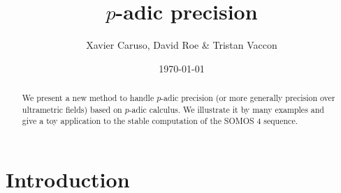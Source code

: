 \documentclass{lms}
\begin{document}
\newtheorem{theo}{Theorem}[section]
\newtheorem{lem}[theo]{Lemma}
\newtheorem{prop}[theo]{Proposition}
\newtheorem{cor}[theo]{Corollary}
\newtheorem{quest}[theo]{Question}
\newtheorem{rem}[theo]{Remark}
\newtheorem{ex}[theo]{Example}
\newtheorem{deftn}[theo]{Definition}
\newtheorem{rmk}[theo]{Remark}

\newcommand{\Z}{\mathbb Z}
\newcommand{\Zp}{\Z_p}
\newcommand{\Q}{\mathbb Q}
\newcommand{\Qp}{\Q_p}
\newcommand{\Fp}{\mathbb{F}_p}
\newcommand{\R}{\mathbb R}
\renewcommand{\O}{\mathcal O}
\newcommand{\OK}{\mathcal{O}_K}
\newcommand{\XX}{\mathbf X}
\newcommand{\trans}{{}^{\text t}}

\newcommand{\GL}{\text{\rm GL}}

\newcommand{\val}{\text{\rm val}}
\newcommand{\pr}{\text{\rm pr}}
\newcommand{\tr}{\text{\rm Tr}}
\newcommand{\com}{\text{\rm Com}}
\newcommand{\Grass}{\text{\rm Grass}}
\renewcommand{\prec}{\text{\rm prec}}

\newcommand{\lb}{\ensuremath{\llbracket}}
\newcommand{\rb}{\ensuremath{\rrbracket}}

\def\todo#1{\ \!\!{\color{red} #1}}
\def\todofor#1#2{\ \!\!{\color{purple} {\bf #1}: #2}}

\title{$p$-adic precision}
\author{Xavier Caruso, David Roe \& Tristan Vaccon}
\date\today

\maketitle
\begin{abstract}
We present a new method to handle $p$-adic precision (or more generally
precision over ultrametric fields) based on $p$-adic calculus.
We illustrate it by many examples and give a toy application to the
stable computation of the SOMOS 4 sequence.
\end{abstract}

\setcounter{tocdepth}{1}
\tableofcontents

\section{Introduction}
\end{document}
